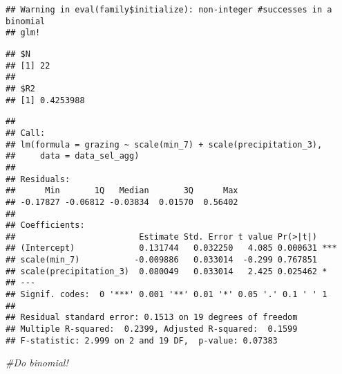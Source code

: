 \documentclass[]{article}
\newenvironment{Shaded}{\begin{snugshade}}{\end{snugshade}}
\newcommand{\KeywordTok}[1]{\textcolor[rgb]{0.13,0.29,0.53}{\textbf{#1}}}
\newcommand{\DataTypeTok}[1]{\textcolor[rgb]{0.13,0.29,0.53}{#1}}
\newcommand{\DecValTok}[1]{\textcolor[rgb]{0.00,0.00,0.81}{#1}}
\newcommand{\StringTok}[1]{\textcolor[rgb]{0.31,0.60,0.02}{#1}}
\newcommand{\CommentTok}[1]{\textcolor[rgb]{0.56,0.35,0.01}{\textit{#1}}}
\newcommand{\OperatorTok}[1]{\textcolor[rgb]{0.81,0.36,0.00}{\textbf{#1}}}
\newcommand{\NormalTok}[1]{#1}
\begin{document}
\begin{Shaded}
\end{Shaded}

\begin{verbatim}
## Warning in eval(family$initialize): non-integer #successes in a binomial
## glm!
\end{verbatim}

\begin{verbatim}
## $N
## [1] 22
## 
## $R2
## [1] 0.4253988
\end{verbatim}

\begin{Shaded}
\end{Shaded}

\begin{verbatim}
## 
## Call:
## lm(formula = grazing ~ scale(min_7) + scale(precipitation_3), 
##     data = data_sel_agg)
## 
## Residuals:
##      Min       1Q   Median       3Q      Max 
## -0.17827 -0.06812 -0.03834  0.01570  0.56402 
## 
## Coefficients:
##                         Estimate Std. Error t value Pr(>|t|)    
## (Intercept)             0.131744   0.032250   4.085 0.000631 ***
## scale(min_7)           -0.009886   0.033014  -0.299 0.767851    
## scale(precipitation_3)  0.080049   0.033014   2.425 0.025462 *  
## ---
## Signif. codes:  0 '***' 0.001 '**' 0.01 '*' 0.05 '.' 0.1 ' ' 1
## 
## Residual standard error: 0.1513 on 19 degrees of freedom
## Multiple R-squared:  0.2399, Adjusted R-squared:  0.1599 
## F-statistic: 2.999 on 2 and 19 DF,  p-value: 0.07383
\end{verbatim}

\begin{Shaded}
\begin{Highlighting}[]
\CommentTok{#Do binomial!}
\end{Highlighting}
\end{Shaded}
\end{document}
